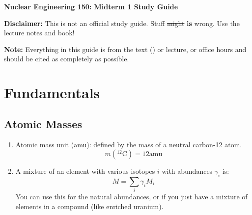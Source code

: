 \documentclass[letter]{article}
\begin{document}
\textbf{\Large{Nuclear Engineering 150: Midterm 1 Study Guide}} \\
\vspace{12pt}

\textbf{Disclaimer:} This is not an official study guide. Stuff \sout{might}
\textbf{is} wrong. Use the lecture notes and book!
\vspace{10pt}

\textbf{Note:} Everything in this guide is from the text () or
lecture, or office hours and should be cited as completely as
possible.

\tableofcontents

\section{Fundamentals}
\label{sec:fundamentals}

\subsection{Atomic Masses}
\begin{enumerate}
\item Atomic mass unit (amu): defined by the mass of a neutral
  carbon-12 atom.
  \begin{equation*}
    m(^{12}\mathrm{C}) = 12 \mathrm{ amu}
  \end{equation*}
\item A mixture of an element with various isotopes $i$ with
  abundances $\gamma_i$ is:
  \begin{equation*}
    M = \sum_i\gamma_i{}M_i
  \end{equation*}
You can use this for the natural abundances, or if you just have a
mixture of elements in a compound (like enriched uranium).
\end{enumerate}



\end{document}
